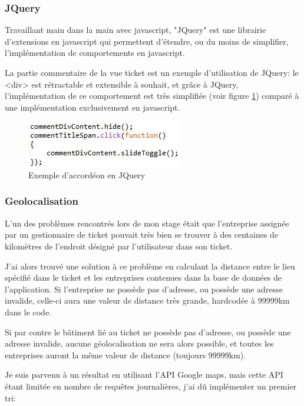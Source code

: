\documentclass[12pt,table,a4paper]{report}
\begin{document}

\subsubsection{JQuery}
Travaillant main dans la main avec javascript, "JQuery" est une librairie d'extensions en javascript qui permettent d'étendre, ou du moins de simplifier, l'implémentation de comportements en javascript.

La partie commentaire de la vue ticket est un exemple d'utilisation de JQuery: le <div> est rétractable et extensible à souhait, et grâce à JQuery, l'implémentation de ce comportement est très simplifiée (voir figure \ref{fig:jquery-collapse-extend-div}) comparé à une implémentation exclusivement en javascript.

\begin{figure}[htbp]
	\centering
		\includegraphics{images/code-snippets/jquery-collapse-extend-div.JPG}
	\caption{Exemple d'accordéon en JQuery}
	\label{fig:jquery-collapse-extend-div}
\end{figure}

\subsubsection{Geolocalisation}
L'un des problèmes rencontrés lors de mon stage était que l'entreprise assignée par un gestionnaire de ticket pouvait très bien se trouver à des centaines de kilomètres de l'endroit désigné par l'utilisateur dans son ticket.

J'ai alors trouvé une solution à ce problème en calculant la distance entre le lieu spécifié dans le ticket et les entreprises contenues dans la base de données de l'application. Si l'entreprise ne possède pas d'adresse, ou possède une adresse invalide, celle-ci aura une valeur de distance très grande, hardcodée à 99999km dans le code.

Si par contre le bâtiment lié au ticket ne possède pas d'adresse, ou possède une adresse invalide, aucune géolocalisation ne sera alors possible, et toutes les entreprises auront la même valeur de distance (toujours 99999km).

Je suis parvenu à un résultat en utilisant l'API Google maps, mais cette API étant limitée en nombre de requêtes journalières, j'ai dû implémenter un premier tri:
\end{document}
